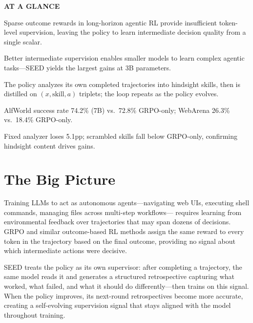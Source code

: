 \documentclass[10pt,twocolumn]{article}
\begin{document}
\begin{mdframed}[backgroundcolor=boxgray,linecolor=rulered,linewidth=1pt,
    innerleftmargin=6pt,innerrightmargin=6pt,
    innertopmargin=6pt,innerbottommargin=6pt]
\textbf{\small AT A GLANCE}\par\vspace{4pt}
\begin{description}[leftmargin=0pt,labelsep=4pt,itemsep=2pt,parsep=0pt,
    font=\small\bfseries]
  \item[Problem:] Sparse outcome rewards in long-horizon agentic RL
    provide insufficient token-level supervision, leaving the policy
    to learn intermediate decision quality from a single scalar.
  \item[Why it matters:] Better intermediate supervision enables
    smaller models to learn complex agentic tasks---SEED yields the
    largest gains at 3B parameters.
  \item[Method:] The policy analyzes its own completed trajectories
    into hindsight skills, then is distilled on $(x, \text{skill}, a)$
    triplets; the loop repeats as the policy evolves.
  \item[Result:] AlfWorld success rate 74.2\% (7B) vs.\ 72.8\%
    GRPO-only; WebArena 26.3\% vs.\ 18.4\% GRPO-only.
  \item[Evidence:] Fixed analyzer loses 5.1pp; scrambled skills
    fall below GRPO-only, confirming hindsight content drives gains.
\end{description}
\end{mdframed}

\section{The Big Picture}

Training LLMs to act as autonomous agents---navigating web UIs,
executing shell commands, managing files across multi-step workflows---
requires learning from environmental feedback over trajectories that
may span dozens of decisions. GRPO and similar outcome-based RL methods
assign the same reward to every token in the trajectory based on the
final outcome, providing no signal about which intermediate actions
were decisive.

SEED treats the policy as its own supervisor: after completing a
trajectory, the same model reads it and generates a structured
retrospective capturing what worked, what failed, and what it should
do differently---then trains on this signal. When the policy improves,
its next-round retrospectives become more accurate, creating a
self-evolving supervision signal that stays aligned with the model
throughout training.
\end{document}
